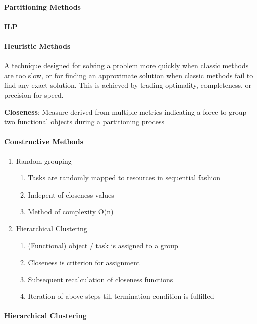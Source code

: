 \documentclass[english]{latex4ei/latex4ei_sheet}
\begin{document}
\paragraph{Partitioning Methods}

\paragraph{ILP}

\paragraph{Heuristic Methods}
A technique designed for solving a problem more quickly when classic methods are too slow, or for finding an approximate solution when classic methods fail to find any exact solution. This is achieved by trading optimality, completeness, or precision for speed.

\textbf{Closeness}: Measure derived from multiple metrics indicating a force to group two functional objects during a partitioning process

\paragraph{Constructive Methods}
\begin{enumerate}
  \item Random grouping
    \begin{enumerate}
      \item Tasks are randomly mapped to resources in sequential fashion
      \item  Indepent of closeness values
      \item Method of complexity O(n)
    \end{enumerate}

  \item Hierarchical Clustering
    \begin{enumerate}
      \item (Functional) object / task is assigned to a group
      \item Closeness is criterion for assignment
      \item Subsequent recalculation of closeness functions
      \item Iteration of above steps till termination condition is fulfilled
    \end{enumerate}
\end{enumerate}

\paragraph{Hierarchical Clustering}
\end{document}
